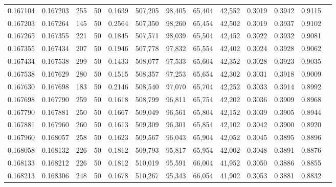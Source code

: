 \begin{tabular}{rrrrrrrrrrrrr}
0.167104 & 0.167203 &   255 &  50 &                                     0.1639 & 507,205 &  98,405 &  65,404 &  42,552 & 0.3019 & 0.3942 & 0.9115 \\
0.167203 & 0.167264 &   145 &  50 &                                     0.2564 & 507,350 &  98,260 &  65,454 &  42,502 & 0.3019 & 0.3937 & 0.9102 \\
0.167265 & 0.167355 &   221 &  50 &                                     0.1845 & 507,571 &  98,039 &  65,504 &  42,452 & 0.3022 & 0.3932 & 0.9081 \\
0.167355 & 0.167434 &   207 &  50 &                                     0.1946 & 507,778 &  97,832 &  65,554 &  42,402 & 0.3024 & 0.3928 & 0.9062 \\
0.167434 & 0.167538 &   299 &  50 &                                     0.1433 & 508,077 &  97,533 &  65,604 &  42,352 & 0.3028 & 0.3923 & 0.9035 \\
0.167538 & 0.167629 &   280 &  50 &                                     0.1515 & 508,357 &  97,253 &  65,654 &  42,302 & 0.3031 & 0.3918 & 0.9009 \\
0.167630 & 0.167698 &   183 &  50 &                                     0.2146 & 508,540 &  97,070 &  65,704 &  42,252 & 0.3033 & 0.3914 & 0.8992 \\
0.167698 & 0.167790 &   259 &  50 &                                     0.1618 & 508,799 &  96,811 &  65,754 &  42,202 & 0.3036 & 0.3909 & 0.8968 \\
0.167790 & 0.167881 &   250 &  50 &                                     0.1667 & 509,049 &  96,561 &  65,804 &  42,152 & 0.3039 & 0.3905 & 0.8944 \\
0.167881 & 0.167960 &   260 &  50 &                                     0.1613 & 509,309 &  96,301 &  65,854 &  42,102 & 0.3042 & 0.3900 & 0.8920 \\
0.167960 & 0.168057 &   258 &  50 &                                     0.1623 & 509,567 &  96,043 &  65,904 &  42,052 & 0.3045 & 0.3895 & 0.8896 \\
0.168058 & 0.168132 &   226 &  50 &                                     0.1812 & 509,793 &  95,817 &  65,954 &  42,002 & 0.3048 & 0.3891 & 0.8876 \\
0.168133 & 0.168212 &   226 &  50 &                                     0.1812 & 510,019 &  95,591 &  66,004 &  41,952 & 0.3050 & 0.3886 & 0.8855 \\
0.168213 & 0.168306 &   248 &  50 &                                     0.1678 & 510,267 &  95,343 &  66,054 &  41,902 & 0.3053 & 0.3881 & 0.8832 \\

\end{tabular}

